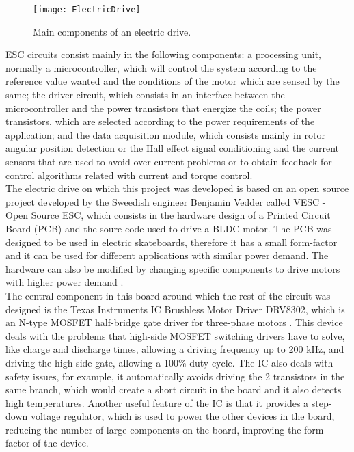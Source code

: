 \begin{figure} [H]
\centering\texttt{[image: ElectricDrive]}
\caption{Main components of an electric drive.}
\label{fig:Electric_Drive}
\end{figure}


ESC circuits consist mainly in the following components: a processing unit, normally a microcontroller, which will control the system according to the reference value wanted and the conditions of the motor which are sensed by the same; the driver circuit, which consists in an interface between the microcontroller and the power transistors that energize the coils; the power transistors, which are selected according to the power requirements of the application; and the data acquisition module, which consists mainly in rotor angular position detection or the Hall effect signal conditioning and the current sensors that are used to avoid over-current problems or to obtain feedback for control algorithms related with current and torque control.\\

The electric drive on which this project was developed is based on an open source project developed by the Sweedish engineer Benjamin Vedder called VESC - Open Source ESC, which consists in the hardware design of a Printed Circuit Board (PCB) and the soure code used to drive a BLDC motor. The PCB was designed to be used in electric skateboards, therefore it has a small form-factor and it can be used for different applications with similar power demand. The hardware can also be modified by changing specific components to drive motors with higher power demand \cite{VedderSite}.\\

The central component in this board around which the rest of the circuit was designed is the Texas Instruments IC Brushless Motor Driver DRV8302, which is an N-type MOSFET half-bridge gate driver for three-phase motors \cite{TIDRV8302}. This device deals with the problems that high-side MOSFET switching drivers have to solve, like charge and discharge times, allowing a driving frequency up to 200 kHz, and driving the high-side gate, allowing a 100\% duty cycle. The IC also deals with safety issues, for example, it automatically avoids driving the 2 transistors in the same branch, which would create a short circuit in the board and it also detects high temperatures. Another useful feature of the IC is that it provides a step-down voltage regulator, which is used to power the other devices in the board, reducing the number of large components on the board, improving the form-factor of the device.\\

